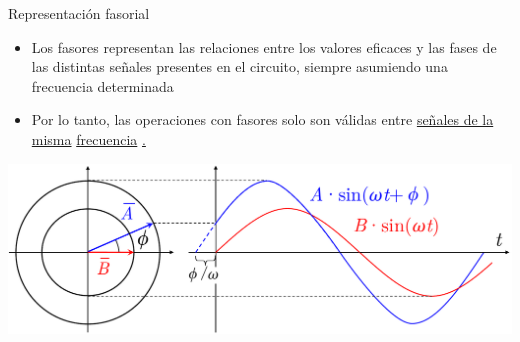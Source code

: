 \documentclass[aspectratio=169, usenames,svgnames,dvipsnames]{beamer}
\begin{document}

\begin{frame}{Representación fasorial}  

    \vspace{2mm}
    \begin{itemize}       
        \item Los fasores \alert{representan las relaciones entre los valores eficaces y las fases} de las distintas señales presentes en el circuito, siempre asumiendo una frecuencia determinada 

        \vspace{3mm}
        \item Por lo tanto, las operaciones con fasores \alert{solo son válidas entre \underline{señales de la misma} \underline{frecuencia}} \hyperlink{diapo:fasores_distintaFrecuencia}{.}
    \end{itemize}
    
    \begin{center}
        \includegraphics[height=0.45\textheight]{../figs/Fasor_definicion.pdf}
    \end{center}
    
\end{frame}

\end{document}
